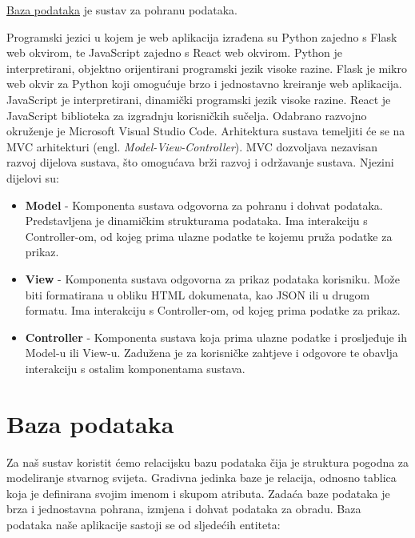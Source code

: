 	\underline{Baza podataka} je sustav za pohranu podataka.

	Programski jezici u kojem je web aplikacija izrađena su Python zajedno s Flask web okvirom, te JavaScript zajedno s React web okvirom. Python je interpretirani, objektno orijentirani programski jezik visoke razine. Flask je mikro web okvir za Python koji omogućuje brzo i jednostavno kreiranje web aplikacija. JavaScript je interpretirani, dinamički programski jezik visoke razine. React je JavaScript biblioteka za izgradnju korisničkih sučelja. Odabrano razvojno okruženje je Microsoft Visual Studio Code.
	Arhitektura sustava temeljiti će se na MVC arhitekturi (engl. \textit{Model-View-Controller}). MVC dozvoljava nezavisan razvoj dijelova sustava, što omogućava brži razvoj i održavanje sustava. Njezini dijelovi su:
	\begin{itemize}
		\item \textbf{Model} - Komponenta sustava odgovorna za pohranu i dohvat podataka. Predstavljena je dinamičkim strukturama podataka. Ima interakciju s Controller-om, od kojeg prima ulazne podatke te kojemu pruža podatke za prikaz.
		\item \textbf{View} - Komponenta sustava odgovorna za prikaz podataka korisniku. Može biti formatirana u obliku HTML dokumenata, kao JSON ili u drugom formatu. Ima interakciju s Controller-om, od kojeg prima podatke za prikaz.
		\item \textbf{Controller} - Komponenta sustava koja prima ulazne podatke i prosljeđuje ih Model-u ili View-u. Zadužena je za korisničke zahtjeve i odgovore te obavlja interakciju s ostalim komponentama sustava.
	\end{itemize}

	

	\pagebreak
				
		\section{Baza podataka}
			
			
		
		\textrm{Za naš sustav koristit ćemo relacijsku bazu podataka čija je struktura pogodna za modeliranje stvarnog svijeta. Gradivna jedinka baze je relacija, odnosno tablica koja je definirana svojim imenom i skupom atributa. Zadaća baze podataka je brza i jednostavna pohrana, izmjena i dohvat podataka za obradu. Baza podataka naše aplikacije sastoji se od sljedećih entiteta:}
		
